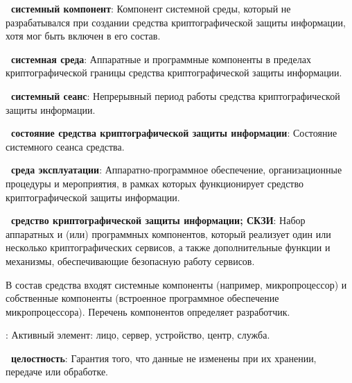 {\bf \thedefctr~системный компонент}:
Компонент системной среды, который не разрабатывался при создании средства
криптографической защиты информации, хотя мог быть включен в его состав.

{\bf \thedefctr~системная среда}:
Аппаратные и программные компоненты в пределах криптографической границы
средства криптографической защиты информации.

{\bf \thedefctr~системный сеанс}:
Непрерывный период работы средства криптографической защиты информации.

{\bf \thedefctr~состояние средства криптографической защиты информации}:
Состояние системного сеанса средства.

{\bf \thedefctr~среда эксплуатации}:
Аппаратно-программное обеспечение, организационные процедуры и мероприятия,
в рамках которых функционирует средство криптографической защиты информации.

{\bf \thedefctr~средство криптографической защиты информации; СКЗИ}:
Набор аппаратных и (или) программных компонентов, который реализует один или 
несколько криптографических сервисов, а также дополнительные функции и 
механизмы, обеспечивающие безопасную работу сервисов.

\begin{note}
В состав средства входят системные компоненты (например, микропроцессор) и
собственные компоненты (встроенное программное обеспечение микропроцессора).
Перечень компонентов определяет разработчик.
\end{note}


:
Активный элемент: лицо, сервер, устройство, центр, служба.


{\bf \thedefctr~целостность}:
Гарантия того, что данные не изменены при их хранении, передаче или обработке. 

